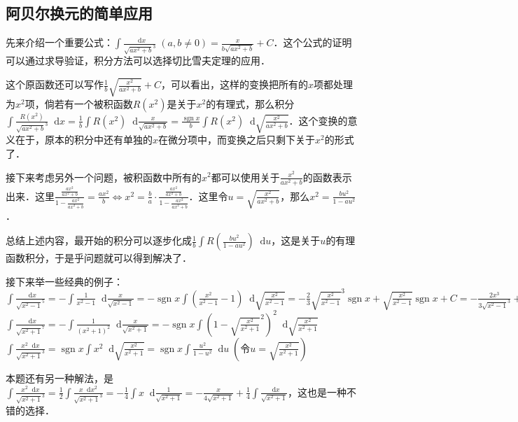 \documentclass{ctexbook}
\DeclareMathOperator{\sgn}{sgn}
\newcommand*{\dif}{\mathop{}\!\mathrm{d}}
\begin{document}
\subsection{阿贝尔换元的简单应用}
先来介绍一个重要公式：$\int\frac{\dif{x}}{\sqrt{ax^{2}+b}^{3}}\;\left(a,b\ne0\right)=\frac{x}{b\sqrt{ax^{2}+b}}+C$．这个公式的证明可以通过求导验证，积分方法可以选择切比雪夫定理的应用．\par
这个原函数还可以写作$\frac{1}{b}\sqrt{\frac{x^{2}}{ax^{2}+b}}+C$，可以看出，这样的变换把所有的$x$项都处理为$x^{2}$项，倘若有一个被积函数$R\left(x^{2}\right)$是关于$x^{2}$的有理式，那么积分$\int\frac{R\left(x^{2}\right)}{\sqrt{ax^{2}+b}^{3}}\dif{x}=\frac{1}{b}\int R\left(x^{2}\right)\dif{\frac{x}{\sqrt{ax^{2}+b}}}=\frac{\sgn{x}}{b}\int R\left(x^{2}\right)\dif{\sqrt{\frac{x^{2}}{ax^{2}+b}}}$．这个变换的意义在于，原本的积分中还有单独的$x$在微分项中，而变换之后只剩下关于$x^{2}$的形式了．\par
接下来考虑另外一个问题，被积函数中所有的$x^{2}$都可以使用关于$\frac{x^{2}}{ax^{2}+b}$的函数表示出来．这里$\frac{\frac{ax^{2}}{ax^{2}+b}}{1-\frac{ax^{2}}{ax^{2}+b}}=\frac{ax^{2}}{b}\Leftrightarrow x^{2}=\frac{b}{a}\cdot\frac{\frac{ax^{2}}{ax^{2}+b}}{1-\frac{ax^{2}}{ax^{2}+b}}$．这里令$u=\sqrt{\frac{x^{2}}{ax^{2}+b}}$，那么$x^{2}=\frac{bu^{2}}{1-au^{2}}$．\par
总结上述内容，最开始的积分可以逐步化成$\frac{1}{b}\int R\left(\frac{bu^{2}}{1-au^{2}}\right)\dif{u}$，这是关于$u$的有理函数积分，于是乎问题就可以得到解决了．\par
接下来举一些经典的例子：\\
$\int\frac{\dif{x}}{\sqrt{x^{2}-1}^{5}}=-\int\frac{1}{x^{2}-1}\dif{\frac{x}{\sqrt{x^{2}-1}}}=-\sgn{x}\int\left(\frac{x^{2}}{x^{2}-1}-1\right)\dif{\sqrt{\frac{x^{2}}{x^{2}-1}}}=-\frac{2}{3}\sqrt{\frac{x^{2}}{x^{2}-1}}^{3}\sgn{x}+\sqrt{\frac{x^{2}}{x^{2}-1}}\sgn{x}+C=-\frac{2x^{3}}{3\sqrt{x^{2}-1}^{3}}+\frac{x}{\sqrt{x^{2}-1}}+C$\\
$\int\frac{\dif{x}}{\sqrt{x^{2}+1}^{7}}=-\int\frac{1}{\left(x^{2}+1\right)^{2}}\dif{\frac{x}{\sqrt{x^{2}+1}}}=-\sgn{x}\int\left(1-\sqrt{\frac{x^{2}}{x^{2}+1}}^{2}\right)^{2}\dif{\sqrt{\frac{x^{2}}{x^{2}+1}}}$\\
$\int\frac{x^{2}\dif{x}}{\sqrt{x^{2}+1}^{3}}=\sgn{x}\int x^{2}\dif{\sqrt{\frac{x^{2}}{x^{2}+1}}}=\sgn{x}\int\frac{u^{2}}{1-u^{2}}\dif{u}\;\left(\text{令}u=\sqrt{\frac{x^{2}}{x^{2}+1}}\right)$\par
本题还有另一种解法，是$\int\frac{x^{2}\dif{x}}{\sqrt{x^{2}+1}^{3}}=\frac{1}{2}\int\frac{x\dif{x^{2}}}{\sqrt{x^{2}+1}^{3}}=-\frac{1}{4}\int x\dif{\frac{1}{\sqrt{x^{2}+1}}}=-\frac{x}{4\sqrt{x^{2}+1}}+\frac{1}{4}\int\frac{\dif{x}}{\sqrt{x^{2}+1}}$，这也是一种不错的选择．\\
\end{document}
